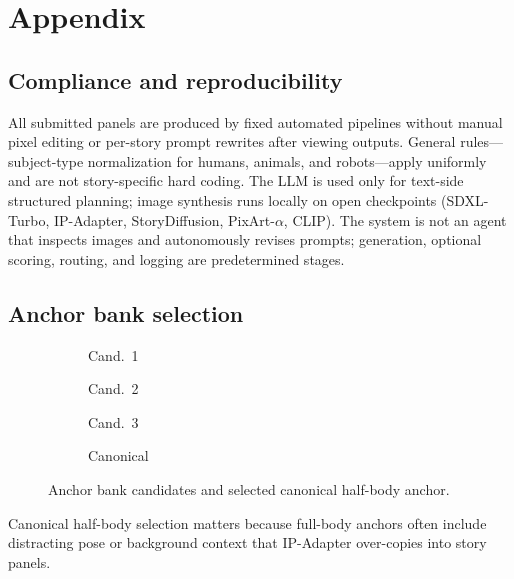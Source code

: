 \section*{Appendix}

\subsection{Compliance and reproducibility}

All submitted panels are produced by fixed automated pipelines without manual pixel editing or per-story prompt rewrites after viewing outputs.
General rules---subject-type normalization for humans, animals, and robots---apply uniformly and are not story-specific hard coding.
The LLM is used only for text-side structured planning; image synthesis runs locally on open checkpoints (SDXL-Turbo, IP-Adapter, StoryDiffusion, PixArt-$\alpha$, CLIP).
The system is not an agent that inspects images and autonomously revises prompts; generation, optional scoring, routing, and logging are predetermined stages.

\subsection{Anchor bank selection}

\begin{figure}[!h]
  \centering
  \begin{subfigure}{0.22\columnwidth}
    \caption{Cand.~1}
  \end{subfigure}
  \begin{subfigure}{0.22\columnwidth}
    \caption{Cand.~2}
  \end{subfigure}
  \begin{subfigure}{0.22\columnwidth}
    \caption{Cand.~3}
  \end{subfigure}
  \begin{subfigure}{0.22\columnwidth}
    \caption{Canonical}
  \end{subfigure}
  \caption{Anchor bank candidates and selected canonical half-body anchor.}
  \label{fig:anchor}
\end{figure}

Canonical half-body selection matters because full-body anchors often include distracting pose or background context that IP-Adapter over-copies into story panels.

